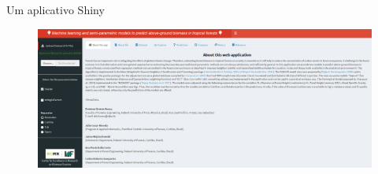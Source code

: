 \documentclass[12pt,ignorenonframetext,aspectratio=1610]{beamer}
\newenvironment{variableblock}[3]{%
  \setbeamercolor{block body}{#2}
  \setbeamercolor{block title}{#3}
  \begin{block}{#1}}{\end{block}}
\begin{document}
\begin{frame}[t]{Um aplicativo Shiny}
	
	\begin{figure}[H]
		\centering
		\includegraphics[scale = .35]{Fig/app.png}
	\end{figure}
	
\end{frame}


		
		

\end{document}
